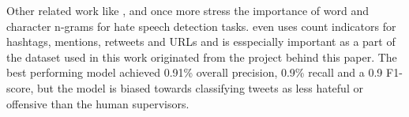Other related work like \cite{Gaydhani2018}, \cite{Malmasi2017} and \cite{ThomasDavidson2020} once more stress the importance of word and character n-grams for hate speech detection tasks. \cite{ThomasDavidson2020} even uses count indicators for hashtags, mentions, retweets and URLs and is esspecially important as a part of the dataset used in this work originated from the project behind this paper. The best performing model achieved 0.91\% overall precision, 0.9\% recall and a 0.9 F1-score, but the model is biased towards classifying tweets as less hateful or offensive than the human supervisors. 
